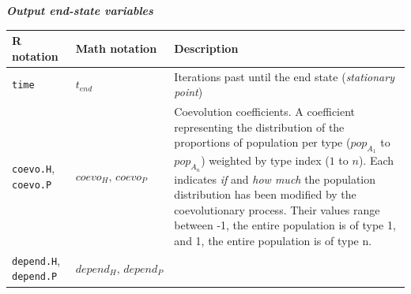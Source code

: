 \documentclass[]{book}
\begin{document}
\newpage

\textbf{\emph{Output end-state variables}}

\begin{longtable}[]{@{}lll@{}}
\toprule
\begin{minipage}[b]{0.36\columnwidth}\raggedright
R notation\strut
\end{minipage} & \begin{minipage}[b]{0.21\columnwidth}\raggedright
Math notation\strut
\end{minipage} & \begin{minipage}[b]{0.34\columnwidth}\raggedright
Description\strut
\end{minipage}\tabularnewline
\midrule
\endhead
\begin{minipage}[t]{0.36\columnwidth}\raggedright
\texttt{time}\strut
\end{minipage} & \begin{minipage}[t]{0.21\columnwidth}\raggedright
\(t_{end}\)\strut
\end{minipage} & \begin{minipage}[t]{0.34\columnwidth}\raggedright
Iterations past until the end state (\emph{stationary point})\strut
\end{minipage}\tabularnewline
\begin{minipage}[t]{0.36\columnwidth}\raggedright
\texttt{coevo.H}, \texttt{coevo.P}\strut
\end{minipage} & \begin{minipage}[t]{0.21\columnwidth}\raggedright
\(coevo_{H},\,coevo_{P}\)\strut
\end{minipage} & \begin{minipage}[t]{0.34\columnwidth}\raggedright
Coevolution coefficients. A coefficient representing the distribution of the proportions of population per type (\(pop_{A_1}\) to \(pop_{A_n}\)) weighted by type index (\(1\) to \(n\)). Each indicates \emph{if} and \emph{how much} the population distribution has been modified by the coevolutionary process. Their values range between -1, the entire population is of type 1, and 1, the entire population is of type n.\strut
\end{minipage}\tabularnewline
\begin{minipage}[t]{0.36\columnwidth}\raggedright
\texttt{depend.H}, \texttt{depend.P}\strut
\end{minipage} & \begin{minipage}[t]{0.21\columnwidth}\raggedright
\(depend_{H},\,depend_{P}\)\strut
\end{minipage} & \begin{minipage}[t]{0.34\columnwidth}\raggedright

\end{minipage}
\end{longtable}
\end{document}
